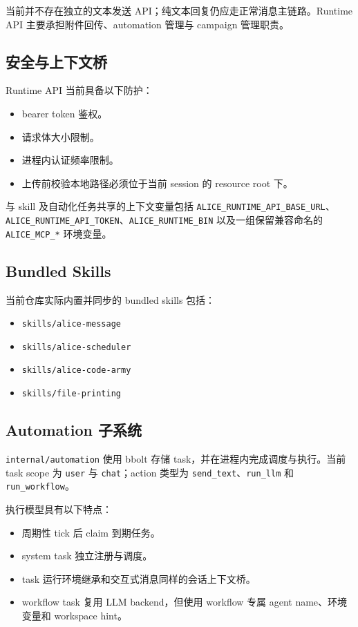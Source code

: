 \documentclass[12pt,a4paper]{ctexart}
\begin{document}
当前并不存在独立的文本发送 API；纯文本回复仍应走正常消息主链路。Runtime API 主要承担附件回传、automation 管理与 campaign 管理职责。

\subsection{安全与上下文桥}

Runtime API 当前具备以下防护：

\begin{itemize}
  \item bearer token 鉴权。
  \item 请求体大小限制。
  \item 进程内认证频率限制。
  \item 上传前校验本地路径必须位于当前 session 的 resource root 下。
\end{itemize}

与 skill 及自动化任务共享的上下文变量包括 \texttt{ALICE\_RUNTIME\_API\_BASE\_URL}、\texttt{ALICE\_RUNTIME\_API\_TOKEN}、\texttt{ALICE\_RUNTIME\_BIN} 以及一组保留兼容命名的 \texttt{ALICE\_MCP\_*} 环境变量。

\subsection{Bundled Skills}

当前仓库实际内置并同步的 bundled skills 包括：

\begin{itemize}
  \item \texttt{skills/alice-message}
  \item \texttt{skills/alice-scheduler}
  \item \texttt{skills/alice-code-army}
  \item \texttt{skills/file-printing}
\end{itemize}

\subsection{Automation 子系统}

\texttt{internal/automation} 使用 bbolt 存储 task，并在进程内完成调度与执行。当前 task scope 为 \texttt{user} 与 \texttt{chat}；action 类型为 \texttt{send\_text}、\texttt{run\_llm} 和 \texttt{run\_workflow}。

执行模型具有以下特点：

\begin{itemize}
  \item 周期性 tick 后 claim 到期任务。
  \item system task 独立注册与调度。
  \item task 运行环境继承和交互式消息同样的会话上下文桥。
  \item workflow task 复用 LLM backend，但使用 workflow 专属 agent name、环境变量和 workspace hint。
\end{itemize}
\end{document}
